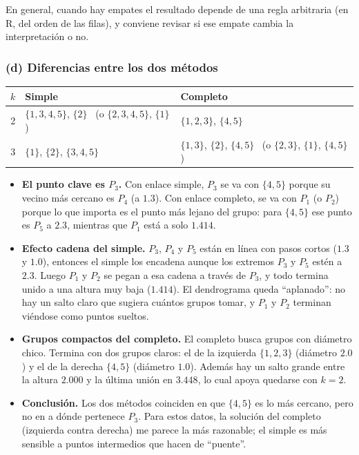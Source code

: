 \documentclass[11pt]{article}\usepackage[]{graphicx}\usepackage[]{xcolor}
\begin{document}
En general, cuando hay empates el resultado depende de una regla arbitraria (en R, del orden de las filas), y conviene revisar si ese empate cambia la interpretación o no.

\subsubsection*{(d) Diferencias entre los dos métodos}

\begin{table}[H]
\centering
\begin{tabular}{c l l}
\toprule
$k$ & Simple & Completo\\
\midrule
2 & $\{1,3,4,5\}$, $\{2\}$ \ (o $\{2,3,4,5\}$, $\{1\}$) & $\{1,2,3\}$, $\{4,5\}$\\
3 & $\{1\}$, $\{2\}$, $\{3,4,5\}$ & $\{1,3\}$, $\{2\}$, $\{4,5\}$ \ (o $\{2,3\}$, $\{1\}$, $\{4,5\}$)\\
\bottomrule
\end{tabular}
\end{table}

\begin{itemize}[leftmargin=*]
\item \textbf{El punto clave es $P_3$.} Con enlace simple, $P_3$ se va con $\{4,5\}$ porque su vecino más cercano es $P_4$ (a $1.3$). Con enlace completo, se va con $P_1$ (o $P_2$) porque lo que importa es el punto más lejano del grupo: para $\{4,5\}$ ese punto es $P_5$ a $2.3$, mientras que $P_1$ está a solo $1.414$.
\item \textbf{Efecto cadena del simple.} $P_3$, $P_4$ y $P_5$ están en línea con pasos cortos ($1.3$ y $1.0$), entonces el simple los encadena aunque los extremos $P_3$ y $P_5$ estén a $2.3$. Luego $P_1$ y $P_2$ se pegan a esa cadena a través de $P_3$, y todo termina unido a una altura muy baja ($1.414$). El dendrograma queda ``aplanado'': no hay un salto claro que sugiera cuántos grupos tomar, y $P_1$ y $P_2$ terminan viéndose como puntos sueltos.
\item \textbf{Grupos compactos del completo.} El completo busca grupos con diámetro chico. Termina con dos grupos claros: el de la izquierda $\{1,2,3\}$ (diámetro $2.0$) y el de la derecha $\{4,5\}$ (diámetro $1.0$). Además hay un salto grande entre la altura $2.000$ y la última unión en $3.448$, lo cual apoya quedarse con $k=2$.
\item \textbf{Conclusión.} Los dos métodos coinciden en que $\{4,5\}$ es lo más cercano, pero no en a dónde pertenece $P_3$. Para estos datos, la solución del completo (izquierda contra derecha) me parece la más razonable; el simple es más sensible a puntos intermedios que hacen de ``puente''.
\end{itemize}
\end{document}
